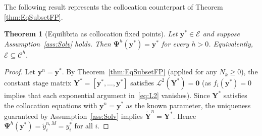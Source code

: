 \documentclass[a4paper,num-refs]{oup-contemporary-spidec}
\newtheorem{theorem}{Theorem}[section]
\begin{document}
The following result represents the collocation counterpart of Theorem \ref{thm:EqSubsetFP}.
\begin{theorem}[Equilibria as collocation fixed points]
\label{thm:EqSubsetFPCOLL}
    Let $\bm{y}^*\in\mathcal{E}$ and suppose Assumption~\ref{ass:Solv} holds.
    Then $\bm{\Psi}^{h}(\bm{y}^*)=\bm{y}^*$ for every $h>0$. Equivalently,
    $\mathcal{E}\subseteq\mathcal{C}^{h}$.
\end{theorem}
\begin{proof}
    Let $\bm{y}^n=\bm{y}^*$. By Theorem~\ref{thm:EqSubsetFP} (applied for any
    $N_k\geq 0$), the constant stage matrix $\bm{Y}^*=[\bm{y}^*,\dots,\bm{y}^*]$
    satisfies $\bm{\mathcal{L}}^2(\bm{Y}^*)=\bm{0}$ (as $f_i(\bm{y}^*)=0$
    implies that each exponential argument in~\eqref{eq:L2} vanishes). Since $\bm{Y}^*$ satisfies the collocation equations with $\bm{y}^n=\bm{y}^*$ as the known parameter, the uniqueness
    guaranteed by Assumption~\ref{ass:Solv} implies $\tilde{\bm{Y}}^n=\bm{Y}^*$.
    Hence $\bm{\Psi}^h(\bm{y}^*)=\tilde{y}_i^{n,M}=y_i^*$ for all $i$.
\end{proof}
\end{document}
